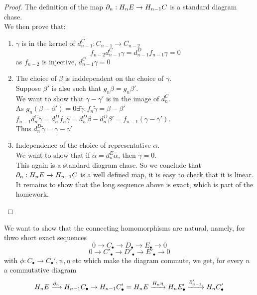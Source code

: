 \documentclass[../main.tex]{subfiles}
\begin{document}
\begin{proof}
The definition of the map $\partial_n:H_nE \to H_{n-1} C$ is a standard diagram chase.\\
We then prove that:
\begin{enumerate}
\item $\gamma$ is in the kernel of $d_{n-1} ^{C}:C_{n-1} \to C_{n-2} $ 
	\[ 
	f_{n-2} d_{n-1}^{C}\gamma = d_{n-1}^{D}f_{n-1} \gamma =0
	\]
	as $ f_{n-2}  $ is injective, $d_{n-1} ^{C}\gamma=0$ 
\item The choice of $\beta$ is inddependent on the choice of $\gamma$.\\
	Suppose $\beta'$ is also such that $g_n\beta= g_n \beta'$.\\
	We want to show that $\gamma-\gamma'$ is in the image of $d_n^{C}$.\\
	As $g_n( \beta-\beta') =0 \exists \tilde\gamma: f_n \tilde\gamma = \beta-\beta'$ \\
	$f_{n-1} d_n^{C}\tilde\gamma=d_n^{D}f_n\tilde\gamma = d_n^{D}\beta - d_n^{D}\beta'= f_{n-1} ( \gamma-\gamma')$.\\
	Thus $d_n^{D}\tilde\gamma= \gamma-\gamma'$ 
\item Independence of the choice of representative $\alpha$.\\
	We want to show that if $\alpha= d_n^{E}\tilde\alpha$, then $\gamma=0$.\\
	This again is a standard diagram chase.
	So we conclude that $\partial_n:H_nE\to H_{n-1} C$ is a well defined map, it is easy to check that it is linear.\\
	It remains to show that the long sequence above is exact, which is part of the homework.
\end{enumerate}
\end{proof}
We want to show that the connecting homomorphisms are natural, namely, for thwo short exact sequences
\[ 
0 \to C_\bullet \to D_\bullet \to E_\bullet \to 0
\]
\[ 
0 \to C'_\bullet \to D'_\bullet \to E'_\bullet \to 0
\]
with $\phi:C_\bullet \to C_\bullet', \psi,\eta$ etc which make the diagram commute, we get, for every $n$ a commutative diagram 
\[ 
	H_nE\xrightarrow{\partial_n} H_{n-1} C_\bullet \to H_{n-1} C_\bullet' = H_n E \xrightarrow{  H_n\eta } H_nE_\bullet' \xrightarrow{\partial'_{n-1} } H_n C'_\bullet
\]
\end{document}
